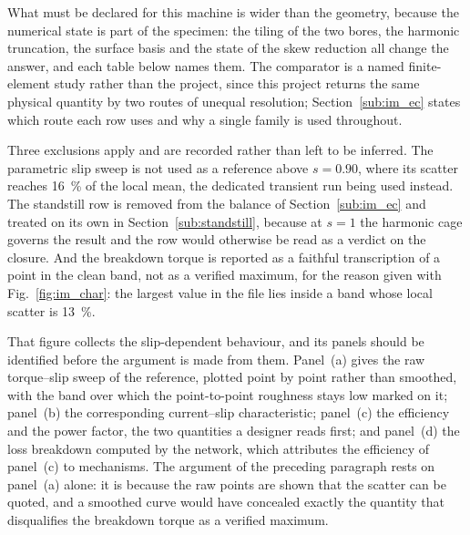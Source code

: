 \documentclass[10pt,a4paper,twocolumn]{article}
\theoremstyle{plain}
\theoremstyle{remark}
\begin{document}
What must be declared for this machine is wider than the geometry,
because the numerical state is part of the specimen: the tiling of the
two bores, the harmonic truncation, the surface basis and the state of
the skew reduction all change the answer, and each table below names
them. The comparator is a named finite-element study rather than the
project, since this project returns the same physical quantity by two
routes of unequal resolution; Section~\ref{sub:im_ec} states which route
each row uses and why a single family is used throughout.

Three exclusions apply and are recorded rather than left to be inferred.
The parametric slip sweep is not used as a reference above
$s=\num{0.90}$, where its scatter reaches \SI{16}{\percent} of the local
mean, the dedicated transient run being used instead. The standstill row
is removed from the balance of Section~\ref{sub:im_ec} and treated on
its own in Section~\ref{sub:standstill}, because at $s=1$ the harmonic
cage governs the result and the row would otherwise be read as a verdict
on the closure. And the breakdown torque is reported as a faithful
transcription of a point in the clean band, not as a verified maximum,
for the reason given with Fig.~\ref{fig:im_char}: the largest value in
the file lies inside a band whose local scatter is \SI{13}{\percent}.

That figure collects the slip-dependent behaviour, and its panels should
be identified before the argument is made from them. Panel~(a) gives the
raw torque--slip sweep of the reference, plotted point by point rather
than smoothed, with the band over which the point-to-point roughness
stays low marked on it; panel~(b) the corresponding current--slip
characteristic; panel~(c) the efficiency and the power factor, the two
quantities a designer reads first; and panel~(d) the loss breakdown
computed by the network, which attributes the efficiency of panel~(c) to
mechanisms. The argument of the preceding paragraph rests on panel~(a)
alone: it is because the raw points are shown that the scatter can be
quoted, and a smoothed curve would have concealed exactly the quantity
that disqualifies the breakdown torque as a verified maximum.
\end{document}
